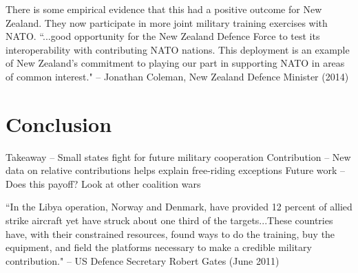 \documentclass[12pt,letterpaper]{article}
\begin{document}
	There is some empirical evidence that this had a positive outcome for New Zealand. They now participate in more joint military training exercises with NATO. ``...good opportunity for the New Zealand Defence Force to test its interoperability with contributing NATO nations. This deployment is an example of New Zealand's commitment to playing our part in supporting NATO in areas of common interest." -- Jonathan Coleman, New Zealand Defence Minister (2014)

\section{Conclusion}
	Takeaway -- Small states fight for future military cooperation
	Contribution -- New data on relative contributions helps explain free-riding exceptions
	Future work -- Does this payoff? Look at other coalition wars

	``In the Libya operation, Norway and Denmark, have provided 12 percent of allied strike aircraft yet have struck about one third of the targets...These countries have, with their constrained resources, found ways to do the training, buy the equipment, and field the platforms necessary to make a credible military contribution." -- US Defence Secretary Robert Gates (June 2011)



\end{document}
